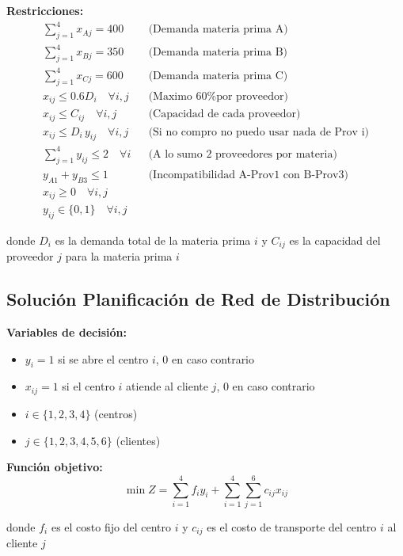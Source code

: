 \documentclass[12pt]{article}
\begin{document}
\textbf{Restricciones:}
\begin{align*}
    \sum_{j=1}^{4} x_{Aj} = 400 && \text{(Demanda materia prima A)} \\
    \sum_{j=1}^{4} x_{Bj} = 350 && \text{(Demanda materia prima B)} \\
    \sum_{j=1}^{4} x_{Cj} = 600 && \text{(Demanda materia prima C)} \\
    x_{ij} \leq 0.6D_i \quad \forall i,j && \text{(Maximo 60\% por proveedor)} \\
    x_{ij} \leq C_{ij} \quad \forall i,j && \text{(Capacidad de cada proveedor)} \\
    x_{ij} \leq D_i\, y_{ij} \quad \forall i,j && \text{(Si no compro no puedo usar nada de Prov i)} \\
    \sum_{j=1}^{4} y_{ij} \leq 2 \quad \forall i && \text{(A lo sumo 2 proveedores por materia)} \\
    y_{A1} + y_{B3} \leq 1 && \text{(Incompatibilidad A-Prov1 con B-Prov3)} \\
    x_{ij} \geq 0 \quad \forall i,j \\
    y_{ij} \in \{0,1\} \quad \forall i,j
\end{align*}
\begin{center}
donde $D_i$ es la demanda total de la materia prima $i$ y $C_{ij}$ es la capacidad del proveedor $j$ para la materia prima $i$
\end{center}

\subsection{Solución Planificación de Red de Distribución}

\textbf{Variables de decisión:}
\begin{itemize}
    \item $y_i = 1$ si se abre el centro $i$, 0 en caso contrario
    \item $x_{ij} = 1$ si el centro $i$ atiende al cliente $j$, 0 en caso contrario
    \item $i \in \{1, 2, 3, 4\}$ (centros)
    \item $j \in \{1, 2, 3, 4, 5, 6\}$ (clientes)
\end{itemize}

\textbf{Función objetivo:}
$$\min Z = \sum_{i=1}^{4} f_i y_i + \sum_{i=1}^{4} \sum_{j=1}^{6} c_{ij} x_{ij}$$
\begin{center}
donde $f_i$ es el costo fijo del centro $i$ y $c_{ij}$ es el costo de transporte del centro $i$ al cliente $j$
\end{center}
\end{document}
